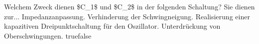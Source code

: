     {Welchem Zweck dienen \$C\_1\$ und \$C\_2\$ in der folgenden Schaltung? Sie dienen zur...}
    {Impedanzanpassung. }
    {Verhinderung der Schwingneigung.}
    {Realisierung einer kapazitiven Dreipunktschaltung für den Oszillator.}
    {Unterdrückung von Oberschwingungen.}
    {true}{false}